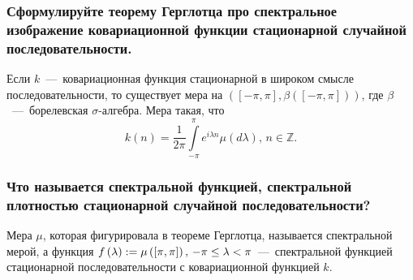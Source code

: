 \subsubsection*{Сформулируйте теорему Герглотца про спектральное изображение ковариационной функции
                стационарной случайной последовательности.}

Если $k$~---~ковариационная функция стационарной в широком смысле последовательности,
то существует мера на
$ \left( \left[ -\pi, \pi \right], \beta \left( \left[ -\pi, \pi \right] \right) \right) $,
где $ \beta $~---~борелевская $ \sigma$-алгебра.
Мера такая, что
\begin{equation*}
  k \left( n \right) =
  \frac{1}{2 \pi } \int \limits_{-\pi }^{ \pi } e^{i \lambda n} \mu \left( d \lambda \right), \,
  n \in \mathbb{Z}.
\end{equation*}

\subsubsection*{Что называется спектральной функцией, спектральной плотностью стационарной случайной
                последовательности?}

Мера $ \mu $, которая фигурировала в теореме Герглотца, называется спектральной мерой, а функция
$f \left( \lambda \right) := \mu \left( \left[ \-\pi, \pi \right] \right), \,
  -\pi \leq \lambda < \pi $~---~спектральной
функцией стационарной последовательности с ковариационной функцией $k$.

